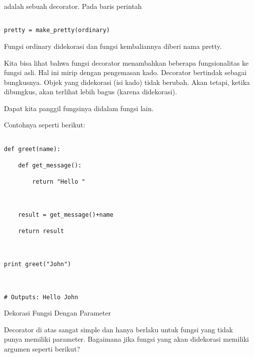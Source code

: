 \documentclass[12pt,a4paper]{article}
\begin{document}
adalah sebuah decorator. Pada baris perintah 



\begin{verbatim}

pretty = make_pretty(ordinary)

\end{verbatim}



Fungsi ordinary didekorasi dan fungsi kembaliannya diberi nama pretty.

Kita bisa lihat bahwa fungsi decorator menambahkan beberapa fungsionalitas ke fungsi asli. Hal ini mirip dengan pengemasan kado. Decorator bertindak sebagai bungkusnya. Objek yang didekorasi (isi kado) tidak berubah. Akan tetapi, ketika dibungkus, akan terlihat lebih bagus (karena didekorasi).



Dapat kita panggil fungsinya didalam fungsi lain.

Contohnya seperti berikut:



\begin{verbatim}

def greet(name):

    def get_message():

        return "Hello "



    result = get_message()+name

    return result



print greet("John")



# Outputs: Hello John

\end{verbatim}





Dekorasi Fungsi Dengan Parameter



Decorator di atas sangat simple dan hanya berlaku untuk fungsi yang tidak punya memiliki parameter. Bagaimana jika fungsi yang akan didekorasi memiliki argumen seperti berikut?
\end{document}
